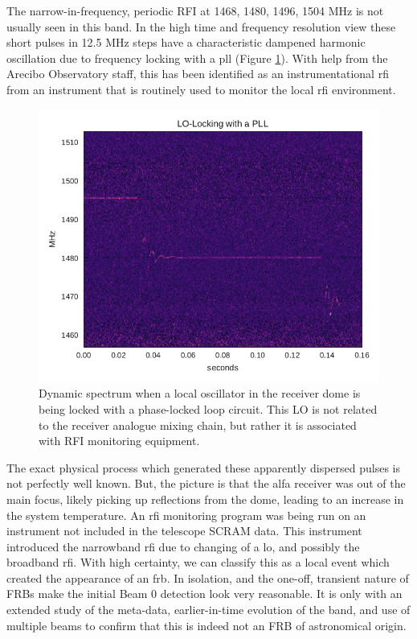 \documentclass[a4paper,fleqn,usenatbib]{mnras}
\begin{document}
The narrow-in-frequency, periodic RFI at 1468, 1480, 1496,
1504 MHz is not usually seen in this band. In the high time and frequency
resolution view these short pulses in 12.5 MHz steps have a characteristic
dampened harmonic oscillation due to frequency locking with a \gls{pll} (Figure
\ref{fig:pll_spectrum}). With help from the Arecibo Observatory staff, this has
been identified as an instrumentational \gls{rfi} from an instrument that is
routinely used to monitor the local \gls{rfi} environment.
%
\begin{figure}
    \includegraphics[width=1.0\linewidth]{figures/pll_spectrum.pdf}
    \caption{Dynamic spectrum when a local oscillator in the receiver dome is
    being locked with a phase-locked loop circuit. This LO is not related to
    the receiver analogue mixing chain, but rather it is associated with RFI
    monitoring equipment.
    }
    \label{fig:pll_spectrum}
\end{figure}
%
The exact physical process which generated these apparently dispersed pulses is
not perfectly well known. But, the picture is that the \gls{alfa} receiver was
out of the main focus, likely picking up reflections from the dome, leading to
an increase in the system temperature. An \gls{rfi} monitoring program was being
run on an instrument not included in the telescope SCRAM data. This instrument
introduced the narrowband \gls{rfi} due to changing of a \gls{lo}, and possibly
the broadband \gls{rfi}. With high certainty, we can classify this as a local
event which created the appearance of an \gls{frb}.  In isolation, and the
one-off, transient nature of FRBs make the initial Beam 0 detection look very
reasonable. It is only with an extended study of the meta-data, earlier-in-time
evolution of the band, and use of multiple beams to confirm that this is indeed
not an FRB of astronomical origin.
\end{document}

